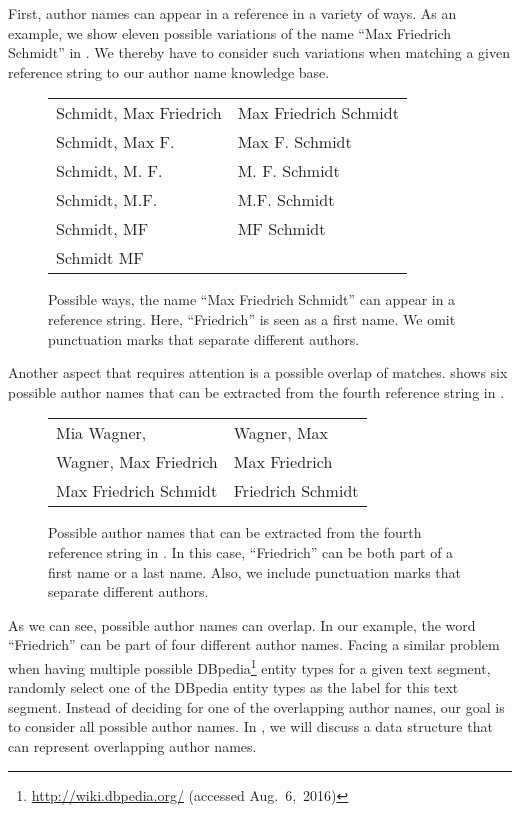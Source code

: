 First, author names can appear in a reference in a variety of ways.
As an example, we show eleven possible variations of the name ``Max Friedrich Schmidt'' in .
We thereby have to consider such variations when matching a given reference string to our author name knowledge base.
\begin{figure}[t]
\centering
\begin{tabular}{l l}
  \tabitem{}Schmidt, Max Friedrich&\tabitem{}Max Friedrich Schmidt\\
  \tabitem{}Schmidt, Max F.       &\tabitem{}Max F. Schmidt\\
  \tabitem{}Schmidt, M. F.        &\tabitem{}M. F. Schmidt\\
  \tabitem{}Schmidt, M.F.         &\tabitem{}M.F. Schmidt\\
  \tabitem{}Schmidt, MF           &\tabitem{}MF Schmidt\\
  \tabitem{}Schmidt MF            &{}
\end{tabular}
\caption{Possible ways, the name ``Max Friedrich Schmidt'' can appear in a reference string. Here, ``Friedrich'' is seen as a first name. We omit punctuation marks that separate different authors.}
\label{fig:example-name-variations}
\vspace{0.4cm}
\end{figure}

Another aspect that requires attention is a possible overlap of matches.
 shows six possible author names that can be extracted from the fourth reference string in .
\begin{figure}[t]
\centering
\begin{tabular}{l l}
  \tabitem{}Mia Wagner,          &\tabitem{}Wagner, Max\\
  \tabitem{}Wagner, Max Friedrich&\tabitem{}Max Friedrich\\
  \tabitem{}Max Friedrich Schmidt&\tabitem{}Friedrich Schmidt
\end{tabular}
\caption{Possible author names that can be extracted from the fourth reference string in . In this case, ``Friedrich'' can be both part of a first name or a last name. Also, we include punctuation marks that separate different authors.}
\label{fig:ref-4-example-author-names}
\end{figure}
As we can see, possible author names can overlap.
In our example, the word ``Friedrich'' can be part of four different author names.
Facing a similar problem when having multiple possible DBpedia\footnote{\url{http://wiki.dbpedia.org/} (accessed Aug.~6,~2016)} entity types for a given text segment, \citet{lu2013web} randomly select one of the DBpedia entity types as the label for this text segment.
Instead of deciding for one of the overlapping author names, our goal is to consider all possible author names.
In , we will discuss a data structure that can represent overlapping author names.

